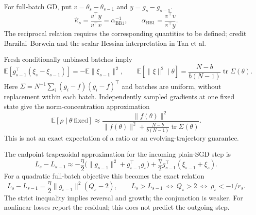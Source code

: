 For full-batch GD, put $v=\theta_s-\theta_{s-1}$ and $y=g_s-g_{s-1}$.
\begin{equation}
\widehat\kappa_s=\frac{v^\top y}{v^\top v}
=\alpha_{\mathrm{BB1}}^{-1},\qquad
\alpha_{\mathrm{BB1}}=\frac{v^\top v}{v^\top y}.
\label{consol:bb}
\end{equation}
The reciprocal relation requires the corresponding quantities to be defined;
credit Barzilai--Borwein and the scalar-Hessian interpretation in Tan et al.

Fresh conditionally unbiased batches imply
\begin{equation}
\mathbb E[g_{s-1}^\top(\xi_s-\xi_{s-1})]
=-\mathbb E\|\xi_{s-1}\|^2,\qquad
\mathbb E[\|\xi\|^2\mid\theta]
=\frac{N-b}{b(N-1)}\operatorname{tr}\Sigma(\theta).
\label{consol:noise}
\end{equation}
Here $\Sigma=N^{-1}\sum_i(g_i-f)(g_i-f)^\top$ and batches are uniform,
without replacement within each batch. Independently sampled gradients at one
fixed state give the norm-concentration approximation
\begin{equation}
\mathbb E[\rho\mid\theta\ \mathrm{fixed}]
\approx
\frac{\|f(\theta)\|^2}
{\|f(\theta)\|^2+\frac{N-b}{b(N-1)}\operatorname{tr}\Sigma(\theta)}.
\label{consol:frozen-cosine}
\end{equation}
This is not an exact expectation of a ratio or an evolving-trajectory guarantee.

The endpoint trapezoidal approximation for the incoming plain-SGD step is
\begin{equation}
L_s-L_{s-1}\approx
-\frac{\eta}{2}\bigl(\|g_{s-1}\|^2+g_{s-1}^\top g_s\bigr)
+\frac{\eta}{2}g_{s-1}^\top(\xi_{s-1}+\xi_s).
\label{consol:sampled-loss}
\end{equation}
For a quadratic full-batch objective this becomes the exact relation
\begin{equation}
L_s-L_{s-1}=\frac{\eta}{2}\|g_{s-1}\|^2(Q_s-2),\qquad
L_s>L_{s-1}\ \Longleftrightarrow\
Q_s>2\ \Longleftrightarrow\ \rho_s<-1/r_s .
\label{consol:quadratic-loss}
\end{equation}
The strict inequality implies reversal and growth; the conjunction is weaker.
For nonlinear losses report the residual; this does not predict the outgoing step.
